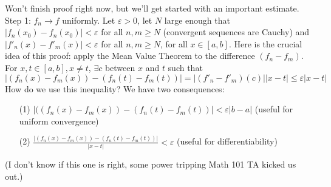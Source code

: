 \documentclass{article}
\theoremstyle{plain}
\theoremstyle{remark}
\newcommand{\ep}{{\varepsilon}}
\begin{document}
Won't finish proof right now, but we'll get started with an important estimate.
Step 1: $f_n \to f$ uniformly.
Let $\ep > 0$, let $N$ large enough that $\lvert f_n(x_0) - f_n(x_0) \rvert < \ep$
for all $n,m \geq N$ (convergent sequences are Cauchy)
and $\lvert f'_n(x) - f'_m(x)\rvert < \ep$ for all $n,m \geq N$, for all $x \in [a,b]$.
Here is the crucial idea of this proof: apply the Mean Value Theorem
to the difference $(f_n - f_m)$.
For $x,t \in [a,b], x\neq t$, $\exists c$ between $x$ and $t$ such that
\[
	\lvert (f_n(x) - f_m(x)) - (f_n(t) - f_m(t)) \rvert
	= \lvert (f'_n - f'_m)(c)\rvert\lvert x - t\rvert \leq \ep \lvert x -t \rvert
\]
How do we use this inequality?
We have two consequences:
\begin{enumerate}
	\item[(1)] $|((f_n(x) - f_m(x)) - (f_n(t) - f_m(t)) | < \ep |b-a|$
		(useful for uniform convergence)
	\item[(2)] $\frac{|(f_n(x) - f_m(x)) - (f_n(t) - f_m(t))|}{|x-t|} < \ep$
		(useful for differentiability)
\end{enumerate}
(I don't know if this one is right, some power tripping Math 101 TA kicked us out.)
\end{document}
